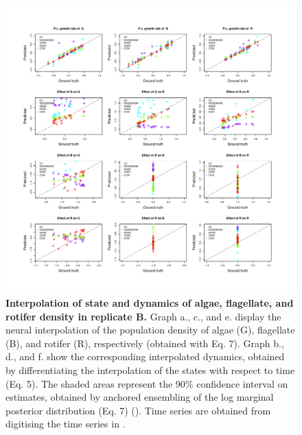 \documentclass[11pt, oneside]{article}
\begin{document}
\begin{figure}[H]
\includegraphics[width=1\linewidth,page=9]{figures/figures_supplementary.pdf}
\caption{
    \textbf{Interpolation of state and dynamics of algae, flagellate, and rotifer density in replicate B.}
    Graph a., c., and e. display the neural interpolation of the population density of algae (G), flagellate (B), and rotifer (R), respectively (obtained with Eq. 7). 
    Graph b., d., and f. show the corresponding interpolated dynamics, obtained by differentiating the interpolation of the states with respect to time (Eq. 5).
    The shaded areas represent the 90\% confidence interval on estimates, obtained by anchored ensembling of the log marginal posterior distribution (Eq. 7) (\cite{Pearce2018}).
    Time series are obtained from digitising the time series in \cite{Hiltunen2013}.
}
\end{figure}
\newpage
\end{document}
